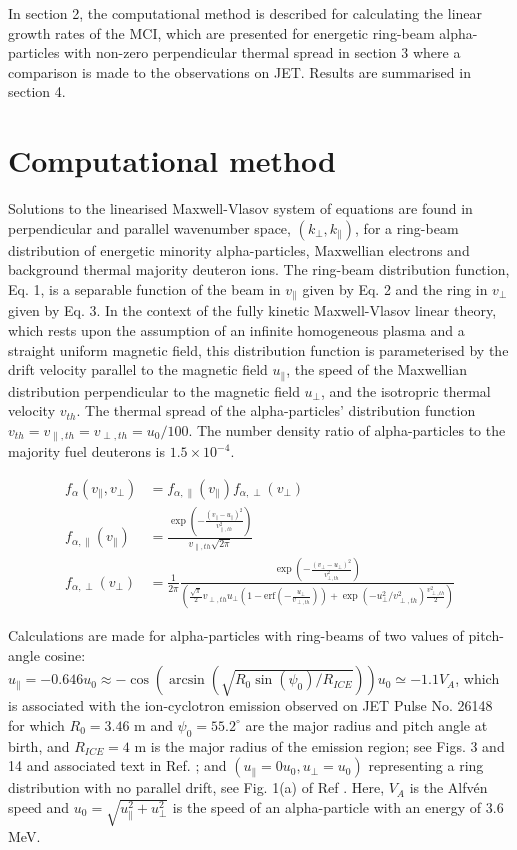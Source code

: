 \documentclass[12pt]{iopart}
\begin{document}
In section 2, the computational method is described for calculating
the linear growth rates of the MCI, which are presented for energetic ring-beam
alpha-particles with non-zero perpendicular thermal spread in section 3
where a comparison is made to the observations on JET.
Results are summarised in section 4.

\section{Computational method}

Solutions to the linearised Maxwell-Vlasov system of equations are found in
perpendicular and parallel wavenumber space, $(k_\bot, k_\parallel)$, for a
ring-beam distribution of energetic minority
alpha-particles, Maxwellian electrons and background thermal majority
deuteron ions. The ring-beam distribution function, Eq. 1, is a separable
function of the beam in $v_\parallel$ given by Eq. 2 and the
ring in $v_\perp$ given by Eq. 3.
In the context of the fully kinetic Maxwell-Vlasov linear theory,
which rests upon the assumption of
an infinite homogeneous plasma and a straight uniform magnetic field,
this distribution function is parameterised by the drift
velocity parallel to the magnetic field $u_\parallel$, the speed of the
Maxwellian distribution perpendicular to the magnetic
field $u_{\perp}$, and the isotropric thermal velocity $v_{th}$. The
thermal spread of the alpha-particles' distribution function 
$v_{th}=v_{\parallel,th}=v_{\perp,th}=u_0/100$. The number density
ratio of alpha-particles to the majority fuel deuterons is $1.5\times10^{-4}$.

\begin{align}
f_\alpha\left(v_\parallel, v_\perp\right) &=
  f_{\alpha,\parallel}\left(v_\parallel\right)f_{\alpha,\perp}\left(v_\perp\right)\\
f_{\alpha,\parallel}\left(v_\parallel\right) &=
  \frac{\exp\left(-\frac{(v_\parallel -
  u_\parallel)^2}{v_{\parallel,th}^2}\right)}{v_{\parallel,th} \sqrt{2
  \pi}}\\
f_{\alpha,\perp}\left(v_\perp\right) &=
  \frac{1}{2\pi}\frac{\exp\left(-\frac{\left(v_\bot -
  u_\bot\right)^2}{v_{\bot,th}^2}\right)}{\left(\frac{\sqrt \pi}{2} v_{\perp,
  th} u_\bot (1 - \mathrm{erf}(-\frac{u_\bot}{v_{\perp,th}})) + \exp(-u_\bot^2 /
  v_{\perp, th}^2) \frac{v_{\perp,th}^2}{2}\right)}
\end{align}

Calculations are made for alpha-particles with ring-beams of two
values of pitch-angle cosine: $u_\parallel=-0.646 u_0 \approx
-\cos(\arcsin(\sqrt{R_0 \sin(\psi_0)/R_{ICE}})) u_0 \simeq -1.1 V_A$, which is
associated with the ion-cyclotron emission observed on JET Pulse No. 26148 for
which $R_0=3.46$ m and
$\psi_0=55.2^\circ$ are the major radius and pitch angle at birth, and
$R_{ICE}=4$ m is the major radius of the emission region; see
Figs. 3 and 14 and associated text in Ref. \cite{Cottrell1993}; and
$(u_\parallel=0 u_0, u_\bot=u_0)$ representing a ring distribution with
no parallel drift, see
Fig. 1(a) of Ref \cite{Cook2013}. Here, $V_A$ is the Alfv{\'en} speed and $u_0=\sqrt{u_\parallel^2 + u_\perp^2}$ is
the speed of an alpha-particle with an energy of 3.6 MeV.
\end{document}
